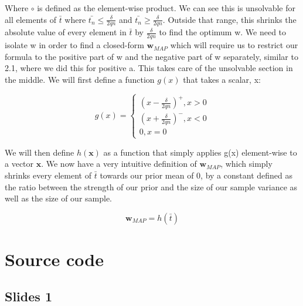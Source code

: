 \documentclass[a4paper,12pt]{article}\usepackage[]{graphicx}\usepackage[]{color}
\begin{document}
Where $\circ$ is defined as the element-wise product. We can see this is unsolvable for all elements of $\bar{t}$ where $\bar{t_n} \leq \frac{\delta}{2qn}$ and $\bar{t_n} \geq \frac{\delta}{2qn}$. Outside that range, this shrinks the absolute value of every element in $\bar{t}$ by $\frac{\delta}{2qn}$ to find the optimum w. We need to isolate w in order to find a closed-form $\bm{w}_{MAP}$ which will require us to restrict our formula to the positive part of w and the negative part of w separately, similar to 2.1, where we did this for positive a. This takes care of the unsolvable section in the middle. We will first define a function $ g(x) $ that takes a scalar, x:

$$
g(x) = 
\begin{cases}
  (x - \frac{\delta}{2qn})^+ , x > 0 \\
  (x + \frac{\delta}{2qn})^- , x < 0 \\
  0, x = 0
\end{cases}
$$

We will then define $h(\bm{x})$ as a function that simply applies g(x) element-wise to a vector $\bm{x}$. We now have a very intuitive definition of $\bm{w}_{MAP}$, which simply shrinks every element of $\bar{t}$ towards our prior mean of 0, by a constant defined as the ratio between the strength of our prior and the size of our sample variance as well as the size of our sample.

$$
  \bm{w}_{MAP} =  h(\bar{t})
$$



\appendix
\section{Source code}

\subsection{Slides 1}
\end{document}

